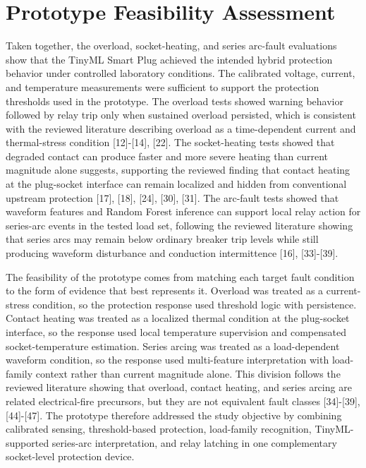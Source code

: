 \section{Prototype Feasibility Assessment}
\label{sec:ch4-overall-feasibility}

Taken together, the overload, socket-heating, and series arc-fault evaluations
show that the TinyML Smart Plug achieved the intended hybrid protection
behavior under controlled laboratory conditions. The calibrated voltage,
current, and temperature measurements were sufficient to support the protection
thresholds used in the prototype. The overload tests showed warning behavior
followed by relay trip only when sustained overload persisted, which is
consistent with the reviewed literature describing overload as a
time-dependent current and thermal-stress condition [12]-[14], [22]. The
socket-heating tests showed that degraded contact can produce faster and more
severe heating than current magnitude alone suggests, supporting the reviewed
finding that contact heating at the plug-socket interface can remain localized
and hidden from conventional upstream protection [17], [18], [24], [30], [31].
The arc-fault tests showed that waveform features and Random Forest inference
can support local relay action for series-arc events in the tested load set,
following the reviewed literature showing that series arcs may remain below
ordinary breaker trip levels while still producing waveform disturbance and
conduction intermittence [16], [33]-[39].

The feasibility of the prototype comes from matching each target fault
condition to the form of evidence that best represents it. Overload was treated
as a current-stress condition, so the protection response used threshold logic
with persistence. Contact heating was treated as a localized thermal condition
at the plug-socket interface, so the response used local temperature
supervision and compensated socket-temperature estimation. Series arcing was
treated as a load-dependent waveform condition, so the response used
multi-feature interpretation with load-family context rather than current
magnitude alone. This division follows the reviewed literature showing that
overload, contact heating, and series arcing are related electrical-fire
precursors, but they are not equivalent fault classes [34]-[39], [44]-[47].
The prototype therefore addressed the study objective by combining calibrated
sensing, threshold-based protection, load-family recognition, TinyML-supported
series-arc interpretation, and relay latching in one complementary socket-level
protection device.

